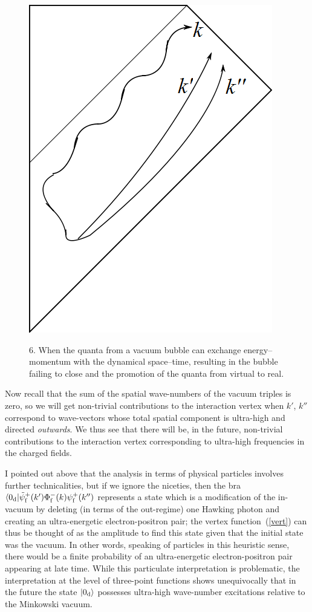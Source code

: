 \documentclass[
%
draft    %
,numberedheadings 
,bibliocites
  ]
  {aipproc}
\begin{document}
\begin{figure}
  \begin{flushright}
{\includegraphics[width=.35\textwidth]{BrokenBubble.png}}
\makebox[.35\textwidth]{$\ $ }
\parbox{.35\textwidth}{6.  When the quanta from a vacuum bubble can exchange energy--momentum with the dynamical space--time, resulting in the bubble failing to close and the promotion of the quanta from virtual to real.}
\end{flushright}
\vspace{-2em}
\label{fig:brokenbubble}
\end{figure}

Now recall that the sum of the spatial wave-numbers of the vacuum triples is zero, so we will get non-trivial contributions to the interaction vertex when $k'$, $k''$ correspond to wave-vectors whose total spatial component is ultra-high and directed {\em outwards}.  We thus see that there will be, in the future, non-trivial contributions to the interaction vertex corresponding to ultra-high frequencies in the charged fields.  

I pointed out above that the analysis in terms of physical particles involves further technicalities, but if we ignore the niceties, then the bra $\langle 0_{\rm d}|{\tilde\psi}_{\rm f}^+(k')\Phi _{\rm f}^- (k)\psi _{\rm f}^+ (k'')$ represents a state 
which is a modification of the in-vacuum by deleting (in terms of the out-regime)
one Hawking photon and creating an ultra-energetic electron-positron pair; the vertex function~(\ref{vert}) can thus be thought of as the amplitude to find this state given that the initial state was the vacuum.  In other words, speaking of particles in this heuristic sense, there would be a finite probability of an ultra-energetic electron-positron pair appearing at late time.  While this particulate interpretation is problematic, the interpretation at the level of three-point functions shows unequivocally that  in the future the state $|0_{\rm d}\rangle$ possesses ultra-high wave-number excitations relative to the Minkowski vacuum.
\end{document}

